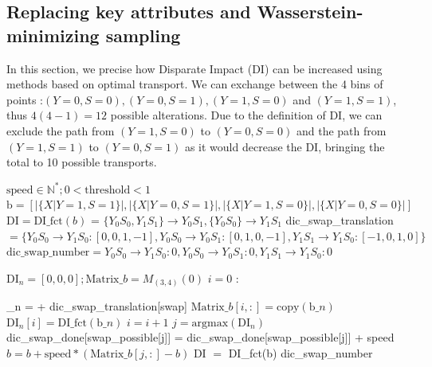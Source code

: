 \documentclass[runningheads, orivec]{llncs}
\begin{document}
\subsection{Replacing key attributes and Wasserstein-minimizing sampling}
\label{app:sec:rep_key_attr} \label{app:sec:wass_sampling}

In this section, we precise how Disparate Impact (DI) can be increased using methods based on optimal transport. We can exchange between the 4 bins of points :$(Y=0, S=0), (Y=0, S=1), (Y=1, S=0)$ and $(Y=1, S=1)$, thus $4(4-1) = 12$ possible alterations. Due to the definition of DI, we can exclude the path from $(Y=1, S=0)$ to $(Y=0, S=0)$ and the path from $(Y=1, S=1)$ to $(Y=0, S=1)$ as it would decrease the DI, bringing the total to 10 possible transports. 

\begin{minipage}{\linewidth}%
\begin{algorithm}[H]
\begin{algorithmic}[2]
\State $\text{speed} \in \mathbb{N}^* ; 0 < \text{threshold} < 1$
\State $\text{b} = [|\{X|Y=1, S=1\}|, |\{X|Y=0, S=1\}|, |\{X|Y=1, S=0\}|, |\{X|Y=0, S=0\}|]$
\State $\text{DI} = \text{DI\_fct}(b)$
\State {} = $\{ Y_0S_0 ,Y_1S_1\}\rightarrow Y_0S_1, \{Y_0S_0\}\rightarrow Y_1S_1$ 
\State dic\_swap\_translation $= \{Y_0S_0 \rightarrow Y_1S_0 : [0, 0, 1, -1], Y_0S_0 \rightarrow Y_0S_1 : [0, 1, 0, -1], Y_1S_1 \rightarrow Y_1S_0 : [-1, 0, 1, 0] \}$ 
\State $\text{dic\_swap\_number} = {Y_0S_0 \rightarrow Y_1S_0 : 0, Y_0S_0 \rightarrow Y_0S_1 : 0, Y_1S_1 \rightarrow Y_1S_0 : 0 }$

\State $\text{DI}_n = [0,0,0] ; \text{Matrix}\_b = M_{(3,4)}(0)$
  \State $i = 0$
    :
    
        \State {}\_n =  + dic\_swap\_translation[swap] 
        \State $\text{Matrix}\_b[i,:] = \text{copy}(\text{b}\_n)$ 
        \State $\text{DI}_n[i] =  \text{DI\_fct}(\text{b}\_n)$
        \State $i = i + 1$
    \EndFor
    \State $j = \text{argmax}(\text{DI}_n)$
    \State dic\_swap\_done[swap\_possible[j]] = dic\_swap\_done[swap\_possible[j]] + speed 
    \State $b = b + \text{speed} * (\text{Matrix}\_b[j, :] - b)$
    \State DI $=$  DI\_fct(b) 
\EndWhile
\State \Return dic\_swap\_number
\end{algorithmic}
\caption{\texttt{Replace($S$,$\widehat{Y}$)} non simplified algorithm}   \label{app:alg:DI_W_miti} 
\end{algorithm}
\end{minipage}
\end{document}
